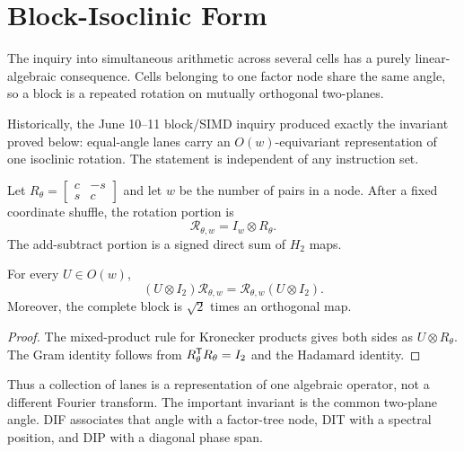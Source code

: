 \section{Block-Isoclinic Form}
\label{sec:isoclinic}

The inquiry into simultaneous arithmetic across several cells has a purely
linear-algebraic consequence.  Cells belonging to one factor node share the
same angle, so a block is a repeated rotation on mutually orthogonal
two-planes.

Historically, the June 10--11 block/SIMD inquiry produced exactly the invariant
proved below: equal-angle lanes carry an $O(w)$-equivariant representation of
one isoclinic rotation.  The statement is independent of any instruction set.

Let $R_\theta=\left[\begin{smallmatrix}c&-s\\s&c\end{smallmatrix}\right]$ and
let $w$ be the number of pairs in a node.  After a fixed coordinate shuffle,
the rotation portion is
\begin{equation}
 \mathcal{R}_{\theta,w}=I_w\otimes R_\theta.
 \label{eq:isoclinic-block}
\end{equation}
The add-subtract portion is a signed direct sum of $H_2$ maps.

\begin{proposition}
For every $U\in O(w)$,
\begin{equation}
 (U\otimes I_2)\mathcal{R}_{\theta,w}
 =\mathcal{R}_{\theta,w}(U\otimes I_2).
 \label{eq:lane-equivariance}
\end{equation}
Moreover, the complete block is $\sqrt2$ times an orthogonal map.
\end{proposition}
\begin{proof}
The mixed-product rule for Kronecker products gives both sides as
$U\otimes R_\theta$.  The Gram identity follows from
$R_\theta^{\mathsf{T}}R_\theta=I_2$ and the Hadamard identity.
\end{proof}

Thus a collection of lanes is a representation of one algebraic operator, not
a different Fourier transform.  The important invariant is the common
two-plane angle.  DIF associates that angle with a factor-tree node, DIT with a
spectral position, and DIP with a diagonal phase span.
